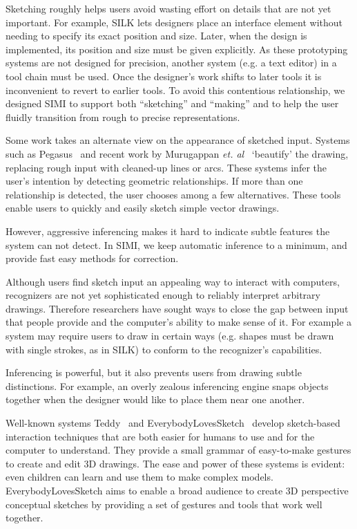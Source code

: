\documentclass{article}
\begin{document}
Sketching roughly helps users avoid wasting effort on details that are
not yet important. For example, SILK lets designers place an interface
element without needing to specify its exact position and size. Later,
when the design is implemented, its position and size must be given
explicitly. As these prototyping systems are not designed for
precision, another system (e.g. a text editor) in a tool chain must be
used. Once the designer's work shifts to later tools it is
inconvenient to revert to earlier tools. To avoid this contentious
relationship, we designed SIMI to support both ``sketching'' and
``making'' and to help the user fluidly transition from rough to
precise representations.

Some work takes an alternate view on the appearance of sketched
input. Systems such as Pegasus~\cite{igarashi-pegasus} and recent work
by Murugappan \textit{et. al}~\cite{murugappan-beautification}
`beautify' the drawing, replacing rough input with cleaned-up lines or
arcs. These systems infer the user's intention by detecting geometric
relationships. If more than one relationship is detected, the user
chooses among a few alternatives. These tools enable users to quickly
and easily sketch simple vector drawings.

However, aggressive inferencing makes it hard to indicate subtle
features the system can not detect. In SIMI, we keep automatic
inference to a minimum, and provide fast easy methods for correction.

Although users find sketch input an appealing way to interact with
computers, recognizers are not yet sophisticated enough to reliably
interpret arbitrary drawings. Therefore researchers have sought ways
to close the gap between input that people provide and the computer's
ability to make sense of it. For example a system may require users to
draw in certain ways (e.g. shapes must be drawn with single strokes,
as in SILK) to conform to the recognizer's capabilities.

Inferencing is powerful, but it also prevents users from drawing
subtle distinctions. For example, an overly zealous inferencing engine
snaps objects together when the designer would like to place them near
one another.

Well-known systems Teddy~\cite{igarashi-teddy} and
EverybodyLovesSketch~\cite{bae-everybody} develop sketch-based
interaction techniques that are both easier for humans to use and for
the computer to understand.  They provide a small grammar of
easy-to-make gestures to create and edit 3D drawings. The ease and
power of these systems is evident: even children can learn and use
them to make complex models. EverybodyLovesSketch aims to enable a
broad audience to create 3D perspective conceptual sketches by
providing a set of gestures and tools that work well together.
\end{document}
